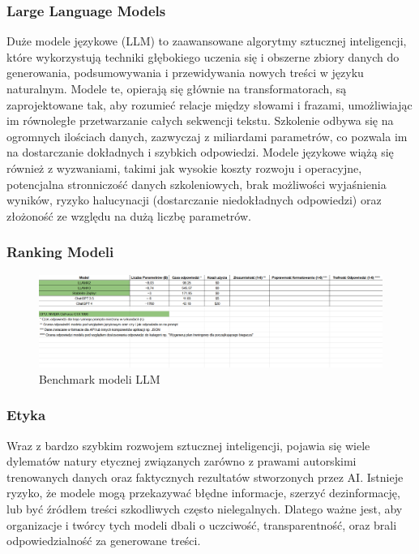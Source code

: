\subsubsection{Large Language Models}
Duże modele językowe (LLM) to zaawansowane algorytmy sztucznej inteligencji, które wykorzystują techniki głębokiego uczenia się i obszerne zbiory danych do generowania, podsumowywania i przewidywania nowych treści w języku naturalnym. Modele te, opierają się głównie na transformatorach, są zaprojektowane tak, aby rozumieć relacje między słowami i frazami, umożliwiając im równoległe przetwarzanie całych sekwencji tekstu. Szkolenie odbywa się na ogromnych ilościach danych, zazwyczaj z miliardami parametrów, co pozwala im na dostarczanie dokładnych i szybkich odpowiedzi. Modele językowe wiążą się również z wyzwaniami, takimi jak wysokie koszty rozwoju i operacyjne, potencjalna stronniczość danych szkoleniowych, brak możliwości wyjaśnienia wyników, ryzyko halucynacji (dostarczanie niedokładnych odpowiedzi) oraz złożoność ze względu na dużą liczbę parametrów.

\subsubsection{Ranking Modeli}

\begin{figure}[h]
    \centering
    \includegraphics[width=1\textwidth]{Obrazy/llms_benchmark.png}
    \caption{Benchmark modeli LLM}
    \label{fig:my_label}
\end{figure}


\subsubsection{Etyka}
Wraz z bardzo szybkim rozwojem sztucznej inteligencji, pojawia się wiele dylematów natury etycznej związanych zarówno z prawami autorskimi trenowanych danych oraz faktycznych rezultatów stworzonych przez AI. Istnieje ryzyko, że modele mogą przekazywać błędne informacje, szerzyć dezinformację, lub być źródłem treści szkodliwych często nielegalnych. Dlatego ważne jest, aby organizacje i twórcy tych modeli dbali o uczciwość, transparentność, oraz brali odpowiedzialność za generowane treści.

